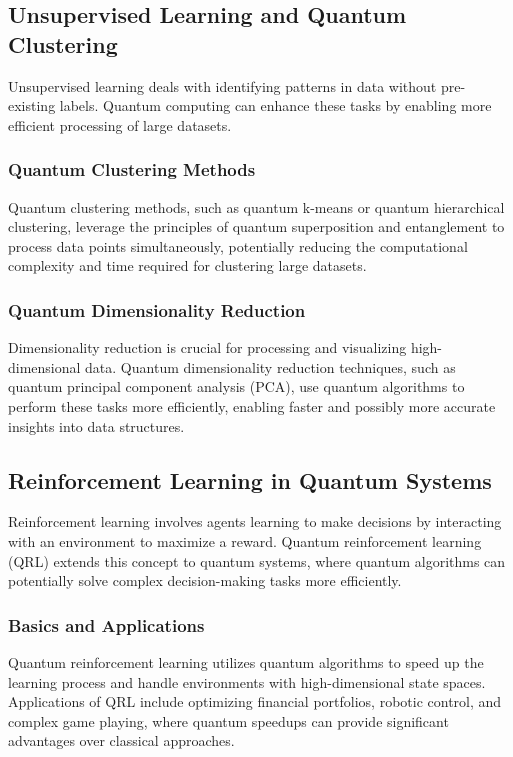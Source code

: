 \documentclass{book}
\begin{document}
\subsection{Unsupervised Learning and Quantum Clustering}
Unsupervised learning deals with identifying patterns in data without pre-existing labels. Quantum computing can enhance these tasks by enabling more efficient processing of large datasets.

\subsubsection{Quantum Clustering Methods}
Quantum clustering methods, such as quantum k-means or quantum hierarchical clustering, leverage the principles of quantum superposition and entanglement to process data points simultaneously, potentially reducing the computational complexity and time required for clustering large datasets.

\subsubsection{Quantum Dimensionality Reduction}
Dimensionality reduction is crucial for processing and visualizing high-dimensional data. Quantum dimensionality reduction techniques, such as quantum principal component analysis (PCA), use quantum algorithms to perform these tasks more efficiently, enabling faster and possibly more accurate insights into data structures.

\subsection{Reinforcement Learning in Quantum Systems}
Reinforcement learning involves agents learning to make decisions by interacting with an environment to maximize a reward. Quantum reinforcement learning (QRL) extends this concept to quantum systems, where quantum algorithms can potentially solve complex decision-making tasks more efficiently.

\subsubsection{Basics and Applications}
Quantum reinforcement learning utilizes quantum algorithms to speed up the learning process and handle environments with high-dimensional state spaces. Applications of QRL include optimizing financial portfolios, robotic control, and complex game playing, where quantum speedups can provide significant advantages over classical approaches.
\end{document}
